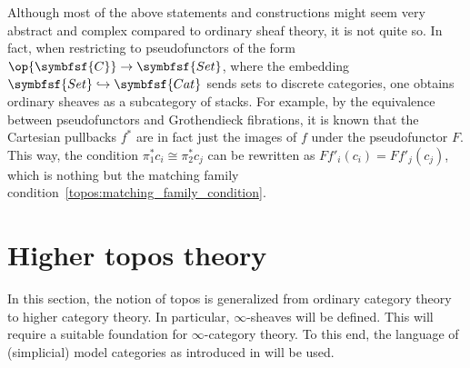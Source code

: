         \begin{remark}[1-sheaves]
            Although most of the above statements and constructions might seem very abstract and complex compared to ordinary sheaf theory, it is not quite so. In fact, when restricting to pseudofunctors of the form $\op{\symbfsf{C}}\rightarrow\symbfsf{Set}$, where the embedding $\symbfsf{Set}\hookrightarrow\symbfsf{Cat}$ sends sets to discrete categories, one obtains ordinary sheaves as a subcategory of stacks. For example, by the equivalence between pseudofunctors and Grothendieck fibrations, it is known that the Cartesian pullbacks $f^*$ are in fact just the images of $f$ under the pseudofunctor $F$. This way, the condition $\pi_1^*c_i\cong\pi^*_2c_j$ can be rewritten as $Ff'_i(c_i)=Ff'_j(c_j)$, which is nothing but the matching family condition~\eqref{topos:matching_family_condition}.
        \end{remark}
    
    \section{Higher topos theory}
    
        In this section, the notion of topos is generalized from ordinary category theory to higher category theory. In particular, $\infty$-sheaves will be defined. This will require a suitable foundation for $\infty$-category theory. To this end, the language of (simplicial) model categories as introduced in  will be used.
    
    
